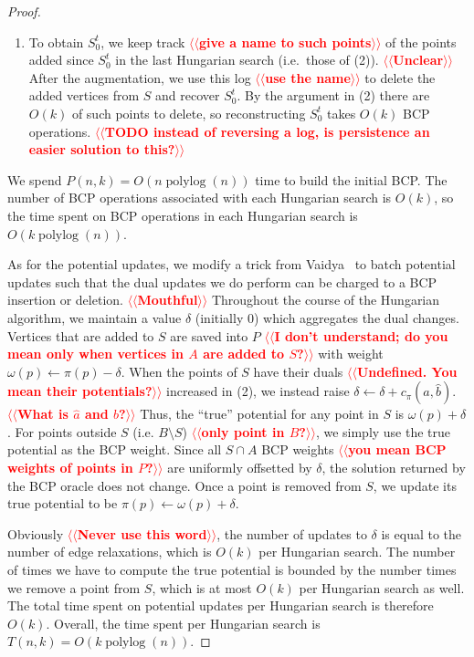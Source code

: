 \documentclass[11pt]{article}
\makeatletter
\def\polylog{\mathop{\mathrm{polylog}}}
\theoremstyle{plain}
\def\n@te#1{\textsf{\boldmath \textbf{$\langle\!\langle$#1$\rangle\!\rangle$}}\leavevmode}
\def\note#1{\textcolor{red}{\n@te{#1}}}
\makeatother
\begin{document}
\begin{figure*}
\begin{proof}
\begin{enumerate}
	\item To obtain $S^t_0$, we keep track \note{give a name to such points} of the
		points added since $S^t_0$ in the last Hungarian search
		(i.e.\ those of (2)). \note{Unclear}
		After the augmentation, we use this log \note{use the name} to delete the added
		vertices from $S$ and recover $S^t_0$.
		By the argument in (2) there are $O(k)$ of such points to
		delete, so reconstructing $S^t_0$ takes $O(k)$ BCP operations.
		\note{TODO instead of reversing a log, is persistence an easier solution to this?}
	\end{enumerate}

	We spend $P(n, k) = O(n \polylog(n))$ time to build
	the initial BCP.
	The number of BCP operations associated with each Hungarian search is
	$O(k)$, so the time spent on BCP operations in each Hungarian search
	is $O(k \polylog(n))$.

  As for the potential updates,
	we modify a trick from Vaidya~\cite{Vaidya89} to batch potential
	updates such that the dual updates we do perform can be charged to a
	BCP insertion or deletion. \note{Mouthful}
	Throughout the course of the Hungarian algorithm, we maintain a value
	$\delta$ (initially 0) which aggregates the dual changes.
	Vertices that are added to $S$ are saved into $P$ \note{I don't understand; do you mean only when vertices in $A$ are added to $S$?} with weight
	$\omega(p) \gets \pi(p) - \delta$.
	When the points of $S$ have their duals \note{Undefined. You mean their potentials?} increased in (2), we instead
	raise $\delta \gets \delta + c_\pi(\hat{a}, \hat{b})$. \note{What is $\hat{a}$ and $\hat{b}$?}
	Thus, the ``true'' potential for any point in $S$ is
	$\omega(p) + \delta$.
	For points outside $S$ (i.e. $B \setminus S$) \note{only point in $B$?}, we simply use the true
	potential as the BCP weight.
	Since all $S \cap A$ BCP weights \note{you mean BCP weights of points in $P$?} are uniformly offsetted by $\delta$, the solution returned by the BCP oracle does not change.
	Once a point is removed from $S$, we update its true potential
	to be $\pi(p) \gets \omega(p) + \delta$.

	Obviously \note{Never use this word}, the number of updates to $\delta$ is equal to the number of
	edge relaxations, which is $O(k)$ per Hungarian search.
	The number of times we have to compute the true potential is bounded by
	the number times we remove a point from $S$, which is at most $O(k)$ per Hungarian search as well.
	The total time spent on potential updates per Hungarian search is therefore
	$O(k)$.
	Overall, the time spent per Hungarian search is $T(n, k) = O(k\polylog(n))$.


\end{proof}
\end{figure*}
\end{document}
